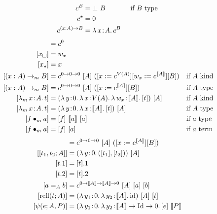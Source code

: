 \begin{figure}
    \centering
    \begin{align*}
        c^B &= \bot\ B \hspace{0.5in}\text{if $B$ type} \\
        c^\star &= 0 \\
        c^{(x : A) \to B} &= {\lambda}\, x\! : \! A.\, c^B
    \end{align*}
    \begin{align*}
        [*] &= c^0 \\
        [ x_{\square} ] &= w_x \\
        [ x_\star ] &= x \\
        [(x : A) \to_m B] &= c^{0 \to 0 \to 0}\ [A]\ ([x := c^{V(A)}][w_x := c^{\sema{A}}][B]) &\text{if}& \text{ $A$ kind} \\
        [(x : A) \to_m B] &= c^{0 \to 0 \to 0}\ [A]\ ([x := c^{\sema{A}}][B]) &\text{if}& \text{ $A$ type} \\
        [\abs{\lambda_m}{x}{A}{t}] &= (\abs{\lambda}{y}{0}{
            \abs{\lambda}{x}{V(A)}{
                \abs{\lambda}{w_x}{\sema{A}}{[t]}
            }
        })\ [A] &\text{if}& \text{ $A$ kind} \\
        [\abs{\lambda_m}{x}{A}{t}] &= (\abs{\lambda}{y}{0}{
            \abs{\lambda}{x}{\sema{A}}{[t]}
        })\ [A] &\text{if}& \text{ $A$ type} \\
        [\app{f}{m}{a}] &= [f]\ \sema{a}\ [a] &\text{if}& \text{ $a$ type} \\
        [\app{f}{m}{a}] &= [f]\ [a] &\text{if}& \text{ $a$ term} \\
    \end{align*}
    \begin{align*}
        [(x : A) \cap B] &= c^{0 \to 0 \to 0}\ [A]\ ([x := c^{\sema{A}}][B]) \\
        [[t_1, t_2; A]] &= (\abs{\lambda}{y}{0}{([t_1], [t_2])})\ [A] \\
        [t.1] &= [t].1 \\
        [t.2] &= [t].2 \\
        [a =_A b] &= c^{0 \to \sema{A} \to \sema{A} \to 0}\ [A]\ [a]\ [b] \\
        [\text{refl}(t; A)] &= (\abs{\lambda}{y_1}{0}{
                \abs{\lambda}{y_2}{\sema{A}}{\fpid}
            })\ [A]\ [t] \\
        [\psi(e; A, P)] &= (\abs{\lambda}{y_1}{0}{
                \abs{\lambda}{y_2}{\sema{A} \to \fpId \to 0}{
                    [e]\ \sema{P}
}}
\end{align*}
\end{figure}
